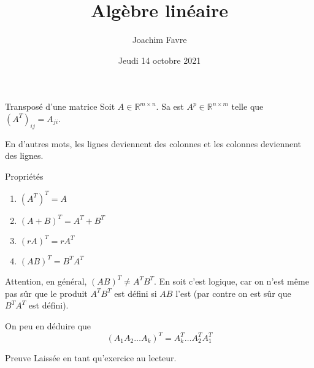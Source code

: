 \documentclass[a4paper]{article}
\title{Algèbre linéaire}
\author{Joachim Favre}
\date{Jeudi 14 octobre 2021}
\begin{document}
\maketitle


\begin{parag}{Transposé d'une matrice}
    Soit $A \in \mathbb{R}^{m \times n}$. Sa  est $A^{p} \in \mathbb{R}^{n \times m}$ telle que $\left(A^T\right)_{ij} = A_{ji}$.

    En d'autres mots, les lignes deviennent des colonnes et les colonnes deviennent des lignes.

\end{parag}

\begin{parag}{Propriétés}
    \begin{enumerate}[left=0pt]
        \item $\left(A^T\right)^T = A$
        \item $\left(A + B\right)^T = A^T + B^T$
        \item $\left(rA\right)^T = rA^T$
        \item $\left(AB\right)^T = B^T A^T$
    \end{enumerate}

    Attention, en général, $\left(AB\right)^T \neq A^T B^T$. En soit c'est logique, car on n'est même pas sûr que le produit $A^T B^T$ est défini si $AB$ l'est (par contre on est sûr que $B^T A^T$ est défini).

    On peu en déduire que
    \[\left(A_1 A_2 \ldots A_k\right)^T = A_k^T \ldots A_2^T A_1^T\]

    \begin{subparag}{Preuve}
        Laissée en tant qu'exercice au lecteur.
    \end{subparag}
\end{parag}
\end{document}
